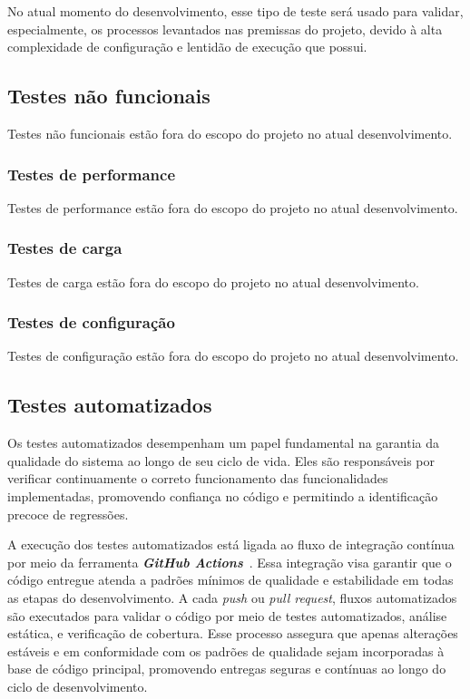 No atual momento do desenvolvimento, esse tipo de teste será usado para validar, especialmente, os processos levantados nas premissas do projeto, devido à alta complexidade de configuração e lentidão de execução que possui.


\subsection{Testes não funcionais}
Testes não funcionais estão fora do escopo do projeto no atual desenvolvimento.
\subsubsection{Testes de performance}
Testes de performance estão fora do escopo do projeto no atual desenvolvimento.
\subsubsection{Testes de carga}
Testes de carga estão fora do escopo do projeto no atual desenvolvimento.
\subsubsection{Testes de configuração}
Testes de configuração estão fora do escopo do projeto no atual desenvolvimento.

\subsection{Testes automatizados}
Os testes automatizados desempenham um papel fundamental na garantia da qualidade do sistema ao longo de seu ciclo de vida. Eles são responsáveis por verificar continuamente o correto funcionamento das funcionalidades implementadas, promovendo confiança no código e permitindo a identificação precoce de regressões.

A execução dos testes automatizados está ligada ao fluxo de integração contínua por meio da ferramenta \textbf{\textit{GitHub Actions}}~\cite{githubactions-2025}. Essa integração visa garantir que o código entregue atenda a padrões mínimos de qualidade e estabilidade em todas as etapas do desenvolvimento.  A cada \textit{push} ou \textit{pull request}, fluxos automatizados são executados para validar o código por meio de testes automatizados, análise estática, e verificação de cobertura. Esse processo assegura que apenas alterações estáveis e em conformidade com os padrões de qualidade sejam incorporadas à base de código principal, promovendo entregas seguras e contínuas ao longo do ciclo de desenvolvimento.

